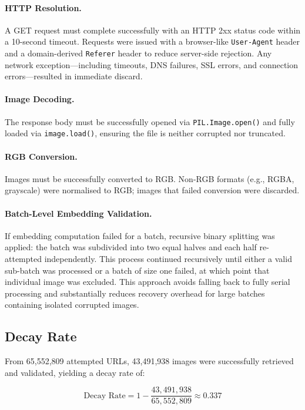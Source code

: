 \paragraph{HTTP Resolution.} A GET request must complete successfully with an HTTP 2xx status code within a 10-second timeout. Requests were issued with a browser-like \texttt{User-Agent} header and a domain-derived \texttt{Referer} header to reduce server-side rejection. Any network exception---including timeouts, DNS failures, SSL errors, and connection errors---resulted in immediate discard.

\paragraph{Image Decoding.} The response body must be successfully opened via \texttt{PIL.Image.open()} and fully loaded via \texttt{image.load()}, ensuring the file is neither corrupted nor truncated.

\paragraph{RGB Conversion.} Images must be successfully converted to RGB. Non-RGB formats (e.g., RGBA, grayscale) were normalised to RGB; images that failed conversion were discarded.

\paragraph{Batch-Level Embedding Validation.} If embedding computation failed for a batch, recursive binary splitting was applied: the batch was subdivided into two equal halves and each half re-attempted independently. This process continued recursively until either a valid sub-batch was processed or a batch of size one failed, at which point that individual image was excluded. This approach avoids falling back to fully serial processing and substantially reduces recovery overhead for large batches containing isolated corrupted images.

\subsection{Decay Rate}

From 65,552,809 attempted URLs, 43,491,938 images were successfully retrieved and validated, yielding a decay rate of:

\[
\text{Decay Rate} = 1 - \frac{43{,}491{,}938}{65{,}552{,}809} \approx 0.337
\]

